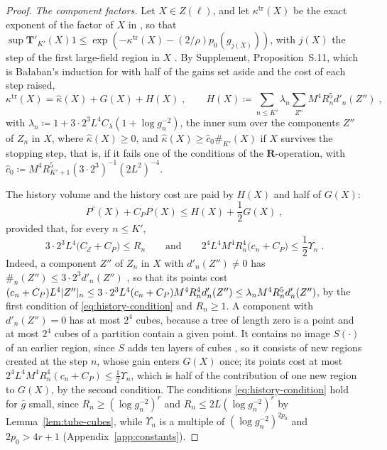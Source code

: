 \documentclass[11pt]{preprint}
\DeclarePairedDelimiter{\abs}{\lvert}{\rvert}
\numberwithin{equation}{section}
\theoremstyle{definition}
\theoremstyle{remark}
\theoremstyle{plain}
\begin{document}
\begin{proof}
\emph{The component factors.} Let $X \in Z(\ell)$, and let $\kappa^{\mathrm{tr}}(X)$ be the exact exponent of the factor of $X$ in \cite[(1.79)]{BalabanLFR2}, so that $\sup\mathbf T'_{K'}(X)1 \leq \exp(-\kappa^{\mathrm{tr}}(X) - (2/\rho)p_0(g_{j(X)}))$, with $j(X)$ the step of the first large-field region in $X$ \cite[p.~384]{BalabanLFR2}. By Supplement, Proposition~S.11, which is Ba{\l}aban's induction for \cite[(1.80), p.~384]{BalabanLFR2} with half of the gains set aside and the cost of each step raised,
\begin{equation}\label{eq:modified-kappa}
    \kappa^{\mathrm{tr}}(X) = \hat\kappa(X) + G(X) + H(X)\;,
    \qquad
    H(X) \coloneqq \sum_{n \leq K'}\lambda_n\sum_{Z''}M^4R_n^5d'_n(Z'')\;,
\end{equation}
with $\lambda_n \coloneqq 1 + 3 \cdot 2^3L^4C_\lambda(1 + \log g_n^{-2})$,
the inner sum over the components $Z''$ of $Z_n$ in $X$, where $\hat\kappa(X) \geq 0$, and $\hat\kappa(X) \geq \hat c_0\#_{K'}(X)$ if $X$ survives the stopping step, that is, if it fails one of the conditions of the $\mathbf R$-operation, with $\hat c_0 \coloneqq M^4R_{K'+1}^5(3 \cdot 2^3)^{-1}(2L^2)^{-4}$.

The history volume and the history cost are paid by $H(X)$ and half of $G(X)$:
\begin{equation}\label{eq:history-payment}
    P^c(X) + C_PP(X) \leq H(X) + \frac12G(X)\;,
\end{equation}
provided that, for every $n \leq K'$,
\begin{equation}\label{eq:history-condition}
    3 \cdot 2^3L^4\bigl(C_{\mathcal E} + C_P\bigr) \leq R_n
    \qquad\text{and}\qquad
    2^4L^4M^4R_n^4\bigl(c_n + C_P\bigr) \leq \frac12\Upsilon_n\;.
\end{equation}
Indeed, a component $Z''$ of $Z_n$ in $X$ with $d'_n(Z'') \neq 0$ has $\#_n(Z'') \leq 3 \cdot 2^3d'_n(Z'')$ \cite[p.~384]{BalabanLFR2}, so that its points cost $(c_n + C_P)L^4\abs{Z''}_n \leq 3 \cdot 2^3L^4(c_n + C_P)M^4R_n^4d'_n(Z'') \leq \lambda_nM^4R_n^5d'_n(Z'')$, by the first condition of \eqref{eq:history-condition} and $R_n \geq 1$. A component with $d'_n(Z'') = 0$ has at most $2^4$ cubes, because a tree of length zero is a point and at most $2^4$ cubes of a partition contain a given point. It contains no image $S(\cdot)$ of an earlier region, since $S$ adds ten layers of cubes \cite[p.~384]{BalabanLFR2}, so it consists of new regions created at the step $n$, whose gain enters $G(X)$ once; its points cost at most $2^4L^4M^4R_n^4(c_n + C_P) \leq \frac12\Upsilon_n$, which is half of the contribution of one new region to $G(X)$, by the second condition. The conditions \eqref{eq:history-condition} hold for $\bar g$ small, since $R_n \geq (\log g_n^{-2})^r$ and $R_n \leq 2L(\log g_n^{-2})^r$ by Lemma~\ref{lem:tube-cubes}, while $\Upsilon_n$ is a multiple of $(\log g_n^{-2})^{2p_0}$ and $2p_0 > 4r + 1$ (Appendix~\ref{app:constants}).


\end{proof}
\end{document}
